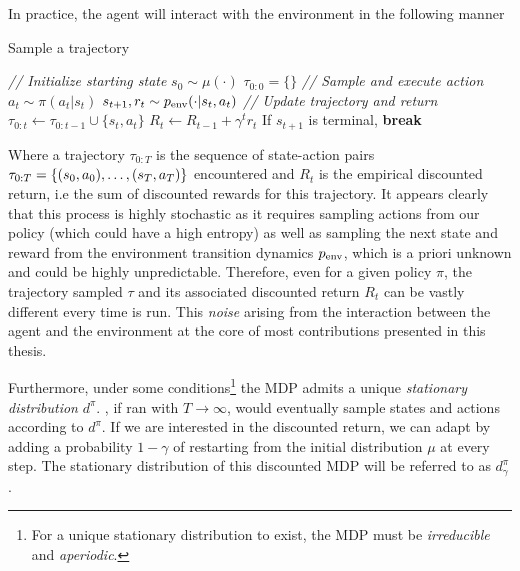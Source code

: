 In practice, the agent will interact with the environment in the following manner

\begin{center}
\begin{minipage}{0.9\textwidth}
\begin{algorithm}[H]
\caption{Sample a trajectory}
\label{alg:sample_traj}
\begin{algorithmic}[1]
\STATE \textit{// Initialize starting state}
\STATE $s_0 \sim \mu(\cdot)$
\STATE $\tau_{0:0} = \{ \}$
\STATE \textit{// Sample and execute action}
\STATE $a_t \sim \pi(a_t|s_t)$
\STATE $s_{t+1}, r_t \sim p_{\text{env}}(\cdot | s_t, a_t)$
\STATE \textit{// Update trajectory and return}
\STATE $\tau_{0:t} \leftarrow \tau_{0:t-1} \cup \{s_t, a_t\}$
\STATE $R_t \leftarrow R_{t-1} + \gamma^t r_t$
\STATE If $s_{t+1}$ is terminal, \textbf{break}
\ENDFOR
\end{algorithmic}
\end{algorithm}
\end{minipage}
\end{center}
\vspace{1em}

Where a trajectory $\tau_{0:T}$ is the sequence of state-action pairs $\tau_{0:T}=\{(s_0,a_0), \ldots,(s_T, a_T) \}$ encountered and $R_t$ is the empirical discounted return, i.e the sum of discounted rewards for this trajectory. It appears clearly that this process is highly stochastic as it requires sampling actions from our policy (which could have a high entropy) as well as sampling the next state and reward from the environment transition dynamics $p_{\text{env}}$, which is a priori unknown and could be highly unpredictable. Therefore, even for a given policy $\pi$, the trajectory sampled $\tau$ and its associated discounted return $R_t$ can be vastly different every time  is run. This \emph{noise} arising from the interaction between the agent and the environment at the core of most contributions presented in this thesis.

Furthermore, under some conditions\footnote{For a unique stationary distribution to exist, the MDP must be \emph{irreducible} and \emph{aperiodic}.} the MDP admits a unique \emph{stationary distribution} $d^\pi$. , if ran with $T\to\infty$, would eventually sample states and actions according to $d^\pi$. If we are interested in the discounted return, we can adapt  by adding a probability $1-\gamma$ of restarting from the initial distribution $\mu$ at every step. The stationary distribution of this discounted MDP will be referred to as $d^\pi_\gamma$.

